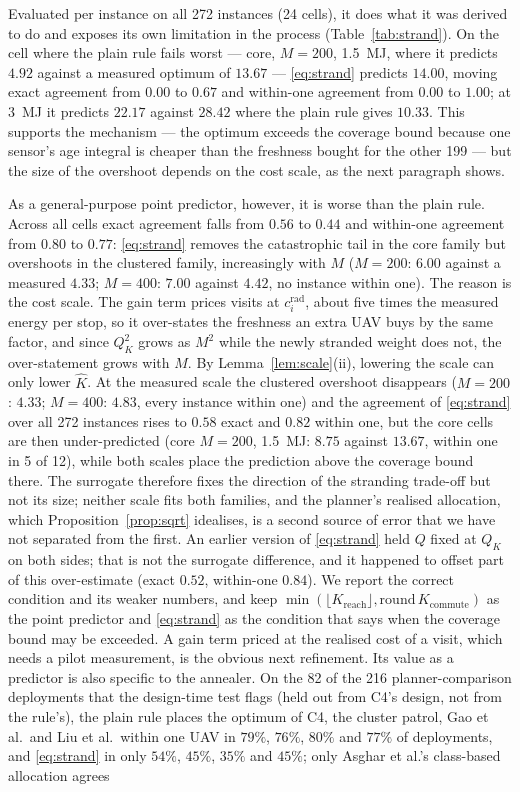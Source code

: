 \documentclass[journal,outdir=./]{IEEEtran}
\newcommand{\Kr}{K_{\mathrm{reach}}}
\newcommand{\Kc}{K_{\mathrm{commute}}}
\begin{document}
Evaluated per instance on all 272 instances (24 cells), it does what it was derived to do and exposes its own limitation in the process (Table~\ref{tab:strand}). On the cell where the plain rule fails worst --- core, $M=200$, 1.5~MJ, where it predicts $4.92$ against a measured optimum of $13.67$ --- \eqref{eq:strand} predicts $14.00$, moving exact agreement from $0.00$ to $0.67$ and within-one agreement from $0.00$ to $1.00$; at 3~MJ it predicts $22.17$ against $28.42$ where the plain rule gives $10.33$. This supports the mechanism --- the optimum exceeds the coverage bound because one sensor's age integral is cheaper than the freshness bought for the other 199 --- but the size of the overshoot depends on the cost scale, as the next paragraph shows.

As a general-purpose point predictor, however, it is worse than the plain rule. Across all cells exact agreement falls from $0.56$ to $0.44$ and within-one agreement from $0.80$ to $0.77$: \eqref{eq:strand} removes the catastrophic tail in the core family but overshoots in the clustered family, increasingly with $M$ ($M=200$: $6.00$ against a measured $4.33$; $M=400$: $7.00$ against $4.42$, no instance within one). The reason is the cost scale. The gain term prices visits at $c_i^{\mathrm{rad}}$, about five times the measured energy per stop, so it over-states the freshness an extra UAV buys by the same factor, and since $Q_K^2$ grows as $M^2$ while the newly stranded weight does not, the over-statement grows with $M$. By Lemma~\ref{lem:scale}(ii), lowering the scale can only lower $\hat K$. At the measured scale the clustered overshoot disappears ($M=200$: $4.33$; $M=400$: $4.83$, every instance within one) and the agreement of \eqref{eq:strand} over all 272 instances rises to $0.58$ exact and $0.82$ within one, but the core cells are then under-predicted (core $M=200$, 1.5~MJ: $8.75$ against $13.67$, within one in 5 of 12), while both scales place the prediction above the coverage bound there. The surrogate therefore fixes the direction of the stranding trade-off but not its size; neither scale fits both families, and the planner's realised allocation, which Proposition~\ref{prop:sqrt} idealises, is a second source of error that we have not separated from the first. An earlier version of \eqref{eq:strand} held $Q$ fixed at $Q_K$ on both sides; that is not the surrogate difference, and it happened to offset part of this over-estimate (exact $0.52$, within-one $0.84$). We report the correct condition and its weaker numbers, and keep $\min(\lfloor\Kr\rfloor,\mathrm{round}\,\Kc)$ as the point predictor and \eqref{eq:strand} as the condition that says when the coverage bound may be exceeded. A gain term priced at the realised cost of a visit, which needs a pilot measurement, is the obvious next refinement. Its value as a predictor is also specific to the annealer. On the 82 of the 216 planner-comparison deployments that the design-time test flags (held out from C4's design, not from the rule's), the plain rule places the optimum of C4, the cluster patrol, Gao et al.\ and Liu et al.\ within one UAV in $79\%$, $76\%$, $80\%$ and $77\%$ of deployments, and \eqref{eq:strand} in only $54\%$, $45\%$, $35\%$ and $45\%$; only Asghar et al.'s class-based allocation agrees 
\end{document}
